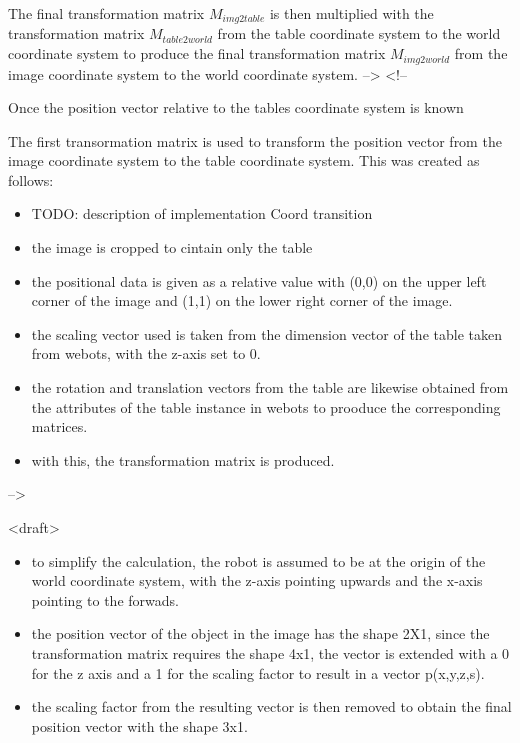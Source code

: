 The final transformation matrix $M_{img2table}$ is then multiplied with the transformation matrix $M_{table2world}$ from the table coordinate system to the world coordinate system to produce the final transformation matrix $M_{img2world}$ from the image coordinate system to the world coordinate system.
 -->
<!-- 

Once the position vector relative to the tables coordinate system is known

The first transormation matrix is used to transform the position vector from the image coordinate system to the table coordinate system. This was created as follows:

\begin{itemize}
    \item TODO: description of implementation Coord transition
      
    \item the image is cropped to cintain only the table
    \item the positional data is given as a relative value with (0,0) on the upper left corner of the image and (1,1) on the lower right corner of the image.
      
    
    
    \item the scaling vector used is taken from the dimension vector of the table taken from webots, with the z-axis set to 0.
    \item the rotation and translation vectors from the table are likewise obtained from the attributes of the table instance in webots to prooduce the corresponding matrices.
    \item with this, the transformation matrix is produced. 
\end{itemize}

-->


<draft>
\begin{itemize}
    \item to simplify the calculation, the robot is assumed to be at the origin of the world coordinate system, with the z-axis pointing upwards and the x-axis pointing to the forwads.  
    \item the position vector of the object in the image has the shape 2X1, since the transformation matrix requires the shape 4x1, the vector is extended with a 0 for the z axis and a 1 for the scaling factor to result in a vector p(x,y,z,s).  
    \item the scaling factor from the resulting vector is then removed to obtain the final position vector with the shape 3x1.  
\end{itemize}
  
